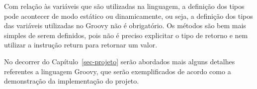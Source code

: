 Com relação às variáveis que são utilizadas na linguagem, a definição dos tipos pode acontecer de modo estático ou dinamicamente, ou seja, a definição dos tipos das variáveis utilizadas no Groovy não é obrigatório. Os métodos são bem mais simples de serem definidos, pois não é preciso explicitar o tipo de retorno e nem utilizar a instrução return para retornar um valor.

No decorrer do Capítulo~\ref{sec-projeto} serão abordados mais alguns detalhes referentes a linguagem Groovy, que serão exemplificados de acordo como a demonstração da implementação do projeto.         



       